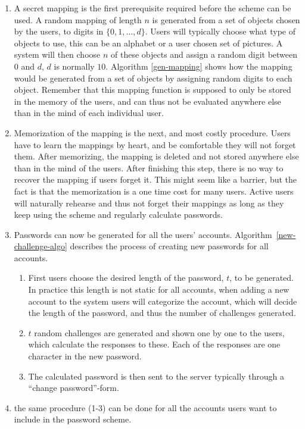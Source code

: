 \begin{enumerate}
    \item A secret mapping is the first prerequisite required before the scheme can be used. A random mapping of length $n$ is generated from a set of objects chosen by the users, to digits in $\{0,1,\dots,d\}$. Users will typically choose what type of objects to use, this can be an alphabet or a user chosen set of pictures. A system will then choose $n$ of these objects and assign a random digit between $0$ and $d$, $d$ is normally $10$. Algorithm \ref{gen-mapping} shows how the mapping would be generated from a set of objects by assigning random digits to each object. Remember that this mapping function is supposed to only be stored in the memory of the users, and can thus not be evaluated anywhere else than in the mind of each individual user.
    \item Memorization of the mapping is the next, and most costly procedure. Users have to learn the mappings by heart, and be comfortable they will not forget them. After memorizing, the mapping is deleted and not stored anywhere else than in the mind of the users. After finishing this step, there is no way to recover the mapping if users forget it. This might seem like a barrier, but the fact is that the memorization is a one time cost for many users. Active users will naturally rehearse and thus not forget their mappings as long as they keep using the scheme and regularly calculate passwords.
    \item Passwords can now be generated for all the users' accounts. Algorithm~\ref{new-challenge-algo} describes the process of creating new passwords for all accounts. 
    \begin{enumerate}
        \item First users choose the desired length of the password, $t$, to be generated. In practice this length is not static for all accounts, when adding a new account to the system users will categorize the account, which will decide the length of the password, and thus the number of challenges generated. 
        \item $t$ random challenges are generated and shown one by one to the users, which calculate the responses to these. Each of the responses are one character in the new password. 
        \item The calculated password is then sent to the server typically through a ``change password''-form. 
    \end{enumerate}
    \item the same procedure (1-3) can be done for all the accounts users want to include in the password scheme.
\end{enumerate}

